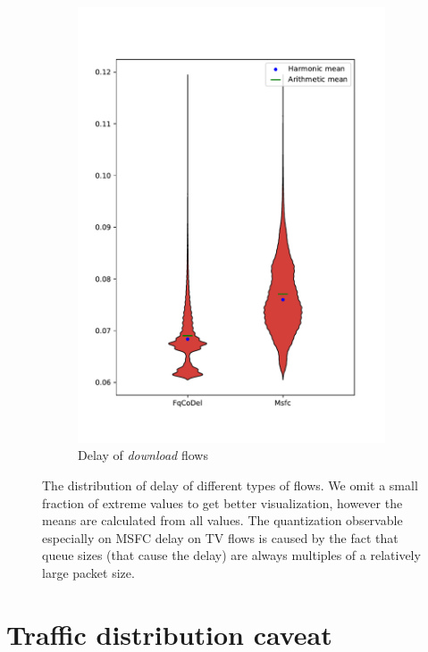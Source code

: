 \begin{figure}
\begin{subfigure}[b]{0.475\textwidth}
		\includegraphics[width=\textwidth]{drawings/type5-delay-down_A}
		\caption[]%
		{{\small Delay of \emph{download} flows}}    
		\label{fig:delay_download}
	\end{subfigure}
	\caption[]
	{\small The distribution of delay of different types of flows. We omit a small fraction of extreme values to get better visualization, however the means are calculated from all values. The quantization observable especially on MSFC delay on TV flows is caused by the fact that queue sizes (that cause the delay) are always multiples of a relatively large packet size.} 
	\label{fig:delay_flows_A}
\end{figure}



\clearpage
\section{Traffic distribution caveat}

